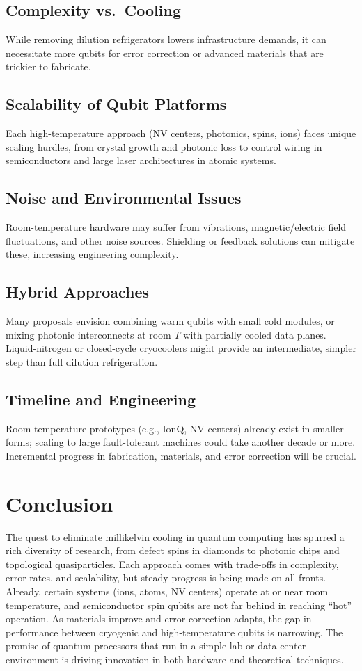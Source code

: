 \documentclass[11pt]{article}
\begin{document}
\subsection{Complexity vs.\ Cooling}
While removing dilution refrigerators lowers infrastructure demands, it can necessitate more qubits for error correction or advanced materials that are trickier to fabricate.

\subsection{Scalability of Qubit Platforms}
Each high-temperature approach (NV centers, photonics, spins, ions) faces unique scaling hurdles, from crystal growth and photonic loss to control wiring in semiconductors and large laser architectures in atomic systems.

\subsection{Noise and Environmental Issues}
Room-temperature hardware may suffer from vibrations, magnetic/electric field fluctuations, and other noise sources. Shielding or feedback solutions can mitigate these, increasing engineering complexity.

\subsection{Hybrid Approaches}
Many proposals envision combining warm qubits with small cold modules, or mixing photonic interconnects at room $T$ with partially cooled data planes. Liquid-nitrogen or closed-cycle cryocoolers might provide an intermediate, simpler step than full dilution refrigeration.

\subsection{Timeline and Engineering}
Room-temperature prototypes (e.g., IonQ, NV centers) already exist in smaller forms; scaling to large fault-tolerant machines could take another decade or more. Incremental progress in fabrication, materials, and error correction will be crucial.

\section{Conclusion}

The quest to eliminate millikelvin cooling in quantum computing has spurred a rich diversity of research, from defect spins in diamonds to photonic chips and topological quasiparticles. Each approach comes with trade-offs in complexity, error rates, and scalability, but steady progress is being made on all fronts. Already, certain systems (ions, atoms, NV centers) operate at or near room temperature, and semiconductor spin qubits are not far behind in reaching “hot” operation. As materials improve and error correction adapts, the gap in performance between cryogenic and high-temperature qubits is narrowing. The promise of quantum processors that run in a simple lab or data center environment is driving innovation in both hardware and theoretical techniques. 
\end{document}
